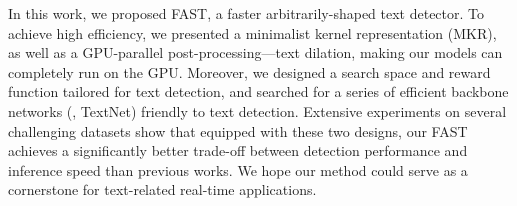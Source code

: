 \documentclass[lettersize,journal]{IEEEtran}
\begin{document}
In this work, we proposed FAST, a faster arbitrarily-shaped text detector.
To achieve high efficiency,
we presented a minimalist kernel representation (MKR), as well as a GPU-parallel post-processing---text dilation, making our models can completely run on the GPU.
Moreover, we designed a search space and reward function tailored for text detection, and searched for a series of efficient backbone networks (\ie, TextNet) friendly to text detection.
Extensive experiments on several challenging datasets show that equipped with these two designs, our FAST achieves a significantly better trade-off between detection performance and inference speed than previous works. 
We hope our method could serve as a cornerstone for text-related real-time applications.






\newpage




\newpage














\vfill
\end{document}

